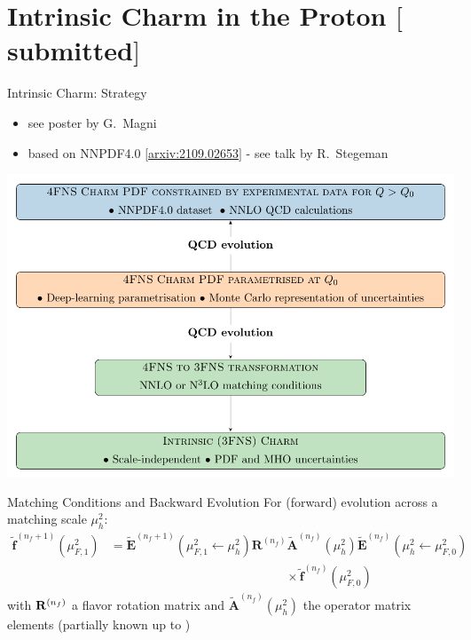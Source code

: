 \documentclass[10pt, usepdftitle=false]{beamer}
\providecommand{\iRef}[1]{{\color{mLightGreen}\small $[$#1$]$}}
\begin{document}
\section{Intrinsic Charm in the Proton \iRef{submitted}}

\begin{frame}{Intrinsic Charm: Strategy}
	\begin{itemize}
		\item see poster by G.~Magni
		\item based on NNPDF4.0 \iRef{\href{https://arxiv.org/abs/2109.02653}{arxiv:2109.02653}} - see talk by R.~Stegeman
	\end{itemize}

	\begin{center}
	\includegraphics[scale=.6]{strategy.pdf}
	\end{center}
\end{frame}

\begin{frame}{Matching Conditions and Backward Evolution}
	For (forward) evolution across a matching scale $\mu_h^2$:
	\begin{align*} \tilde{\mathbf{f}}^{(n_f+1)}(\mu_{F,1}^2) &= \tilde{\mathbf{E}}^{(n_f+1)}(\mu_{F,1}^2\leftarrow \mu_{h}^2)
		{\mathbf{R}^{(n_f)}}
		\tilde{\mathbf{A}}^{(n_f)}(\mu_{h}^2)
		\tilde{\mathbf{E}}^{(n_f)}(\mu_{h}^2\leftarrow \mu_{F,0}^2) \\
		& \hspace{170pt} \times \tilde{\mathbf{f}}^{(n_f)}(\mu_{F,0}^2)
	\end{align*}
	with $\vb R^{(n_f)}$ a flavor rotation matrix and $\tilde{\mathbf{A}}^{(n_f)}(\mu_{h}^2)$ the operator
	matrix elements (partially known up to \nnnlo{})

\end{frame}
\end{document}
